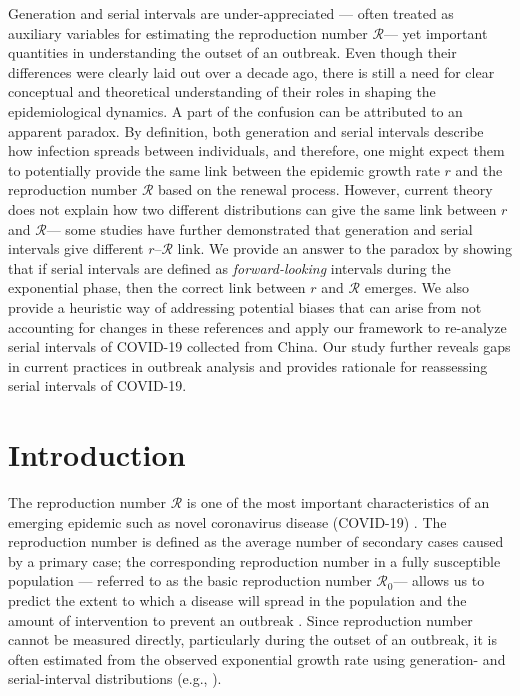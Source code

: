 \documentclass[12pt]{article}
\newcommand{\Rx}[1]{\ensuremath{{\mathcal R}_{#1}}\xspace}
\newcommand{\Ro}{\Rx{0}}
\newcommand{\RR}{\ensuremath{{\mathcal R}}\xspace}
\begin{document}
Generation and serial intervals are under-appreciated --- often treated as auxiliary variables for estimating the reproduction number \RR --- yet important quantities in understanding the outset of an outbreak.
Even though their differences were clearly laid out over a decade ago, there is still a need for clear conceptual and theoretical understanding of their roles in shaping the epidemiological dynamics.
A part of the confusion can be attributed to an apparent paradox.
By definition, both generation and serial intervals describe how infection spreads between individuals, and therefore, one might expect them to potentially provide the same link between the epidemic growth rate $r$ and the reproduction number \RR based on the renewal process.
However, current theory does not explain how two different distributions can give the same link between $r$ and \RR --- some studies have further demonstrated that generation and serial intervals give different $r$--\RR link.
We provide an answer to the paradox by showing that if serial intervals are defined as \emph{forward-looking} intervals during the exponential phase, then the correct link between $r$ and \RR emerges.
We also provide a heuristic way of addressing potential biases that can arise from not accounting for changes in these references and apply our framework to re-analyze serial intervals of COVID-19 collected from China.
Our study further reveals gaps in current practices in outbreak analysis and provides rationale for reassessing serial intervals of COVID-19.

\pagebreak

\section{Introduction}

The reproduction number \RR is one of the most important characteristics of an emerging epidemic such as novel coronavirus disease (COVID-19) \citep{majumder2020early}.
The reproduction number is defined as the average number of secondary cases caused by a primary case;
the corresponding reproduction number in a fully susceptible population --- referred to as the basic reproduction number \Ro --- allows us to predict the extent to which a disease will spread in the population and the amount of intervention to prevent an outbreak \citep{anderson1991infectious}.
Since reproduction number cannot be measured directly, particularly during the outset of an outbreak, it is often estimated from the observed exponential growth rate using generation- and serial-interval distributions (e.g., \cite{du2020serial, jung2020real, li2020early, zhao2020preliminary}).
\end{document}
